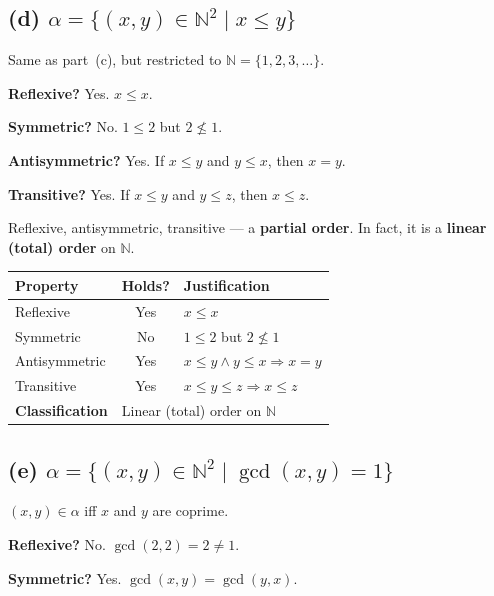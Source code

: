\documentclass[12pt, a4paper]{article}
\newcommand{\N}{\mathbb{N}}
\begin{document}
\subsection*{(d)\; $\alpha = \{(x,y) \in \N^2 \mid x \le y\}$}

Same as part~(c), but restricted to $\N = \{1, 2, 3, \dots\}$.

\textbf{Reflexive?} Yes.  $x \le x$. \checkmark

\textbf{Symmetric?} No.  $1 \le 2$ but $2 \nleq 1$.

\textbf{Antisymmetric?} Yes.  If $x \le y$ and $y \le x$, then $x=y$. \checkmark

\textbf{Transitive?} Yes.  If $x \le y$ and $y \le z$, then $x \le z$. \checkmark

\begin{answerbox}
Reflexive, antisymmetric, transitive --- a \textbf{partial order}. In fact, it is a \textbf{linear (total) order} on $\N$.
\end{answerbox}

\begin{center}
\renewcommand{\arraystretch}{1.15}
\begin{tabular}{l|c|l}
  \toprule
  \textbf{Property} & \textbf{Holds?} & \textbf{Justification} \\
  \midrule
  Reflexive      & Yes & $x \le x$ \\
  Symmetric      & No  & $1\le 2$ but $2\nleq 1$ \\
  Antisymmetric  & Yes & $x\le y\land y\le x \Rightarrow x=y$ \\
  Transitive     & Yes & $x\le y\le z \Rightarrow x\le z$ \\
  \midrule
  \textbf{Classification} & \multicolumn{2}{l}{Linear (total) order on $\N$} \\
  \bottomrule
\end{tabular}
\end{center}

\subsection*{(e)\; $\alpha = \{(x,y) \in \N^2 \mid \gcd(x,y) = 1\}$}

$(x,y) \in \alpha$ iff $x$ and $y$ are coprime.

\textbf{Reflexive?} No.  $\gcd(2,2) = 2 \ne 1$.

\textbf{Symmetric?} Yes.  $\gcd(x,y) = \gcd(y,x)$. \checkmark
\end{document}
